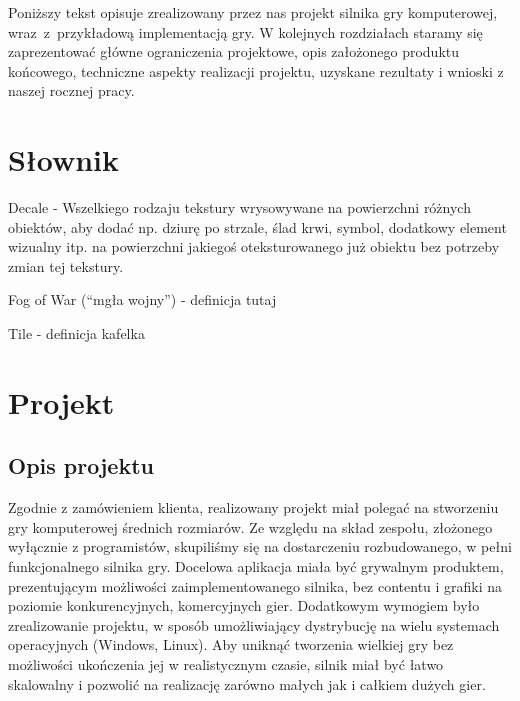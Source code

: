 \documentclass[licencjacka]{pracamgr}
\begin{document}
Poniższy tekst opisuje zrealizowany przez nas projekt silnika gry komputerowej, wraz~z~przykładową implementacją gry. W kolejnych
rozdziałach staramy się zaprezentować główne ograniczenia projektowe, opis założonego produktu końcowego, 
techniczne aspekty realizacji projektu, uzyskane rezultaty i wnioski z naszej rocznej pracy. 




\chapter{Słownik}
  Decale - Wszelkiego rodzaju tekstury wrysowywane na powierzchni różnych obiektów, aby dodać np. dziurę po strzale,
  ślad krwi, symbol, dodatkowy element wizualny itp. na powierzchni jakiegoś oteksturowanego już obiektu bez potrzeby
  zmian tej tekstury.

  Fog of War (``mgła wojny'') - definicja tutaj

  Tile - definicja kafelka

\chapter{Projekt}

  \section{Opis projektu}
  Zgodnie z zamówieniem klienta, realizowany projekt miał polegać na stworzeniu gry komputerowej
  średnich rozmiarów. Ze względu na skład zespołu, złożonego wyłącznie z programistów, skupiliśmy się
  na dostarczeniu rozbudowanego, w pełni funkcjonalnego silnika gry.
  Docelowa aplikacja miała być grywalnym produktem, prezentującym możliwości zaimplementowanego silnika,
  bez contentu i grafiki na poziomie konkurencyjnych, komercyjnych gier. Dodatkowym wymogiem było zrealizowanie
  projektu, w sposób umożliwiający dystrybucję na wielu systemach operacyjnych (Windows, Linux). Aby uniknąć
  tworzenia wielkiej gry bez możliwości ukończenia jej w realistycznym czasie, silnik miał być łatwo skalowalny
  i pozwolić na realizację zarówno małych jak i całkiem dużych gier.
\end{document}
